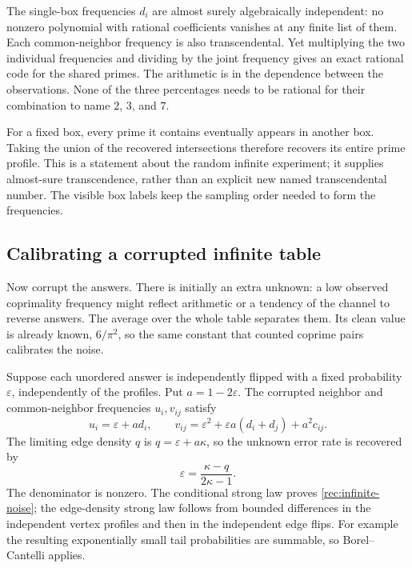 The single-box frequencies $d_i$ are almost surely algebraically
independent: no nonzero polynomial with rational coefficients vanishes
at any finite list of them. Each common-neighbor frequency is also
transcendental. Yet multiplying the two individual frequencies and
dividing by the joint frequency gives an exact rational code for the
shared primes. The arithmetic is in the dependence between the
observations. None of the three percentages needs to be rational for
their combination to name $2$, $3$, and $7$.

For a fixed box, every prime it contains eventually appears in another
box. Taking the union of the recovered intersections therefore recovers
its entire prime profile. This is a statement about the random infinite
experiment; it supplies almost-sure transcendence, rather than an
explicit new named transcendental number. The visible box labels keep
the sampling order needed to form the frequencies.

\subsection{Calibrating a corrupted infinite table}

Now corrupt the answers. There is initially an extra unknown: a low
observed coprimality frequency might reflect arithmetic or a tendency
of the channel to reverse answers. The average over the whole table
separates them. Its clean value is already known, $6/\pi^2$, so the
same constant that counted coprime pairs calibrates the noise.

Suppose each unordered answer is independently flipped with a fixed
probability $\varepsilon$, independently of the profiles. Put
$a=1-2\varepsilon$. The corrupted neighbor and common-neighbor
frequencies $u_i,v_{ij}$ satisfy
\begin{equation}\label{rec:infinite-noise}
 u_i=\varepsilon+a d_i,\qquad
 v_{ij}=\varepsilon^2+\varepsilon a(d_i+d_j)+a^2c_{ij}.
\end{equation}
The limiting edge density $q$ is
$q=\varepsilon+a\kappa$, so the unknown error rate is recovered by
\begin{equation}\label{rec:epsilon}
 \varepsilon=\frac{\kappa-q}{2\kappa-1}.
\end{equation}
The denominator is nonzero. The conditional strong law proves
\eqref{rec:infinite-noise}; the edge-density strong law follows from
bounded differences in the independent vertex profiles and then in the
independent edge flips. For example the resulting exponentially small
tail probabilities are summable, so Borel--Cantelli applies.

